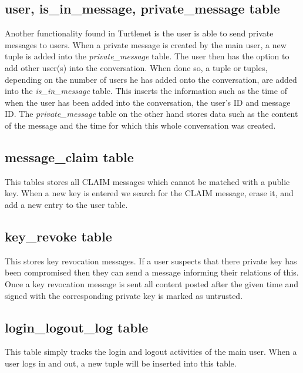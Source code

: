 \subsection{user, is\_in\_message, private\_message table}
Another functionality found in Turtlenet is the user is able to send private 
messages to users. When a private message is created by the main user, a new 
tuple is added into the {\it private\_message} table. The user then has the 
option to add other user(s) into the conversation. When done so, a tuple or 
tuples, depending on the number of users he has added onto the conversation, are 
added into the {\it is\_in\_message} table. This inserts the information such as 
the time of when the user has been added into the conversation, the user's ID 
and message ID. The {\it private\_message} table on the other hand stores data 
such as the content of the message and the time for which this whole conversation 
was created. 

\subsection{message\_claim table}
This tables stores all CLAIM messages which cannot be matched with a public key.
When a new key is entered we search for the CLAIM message, erase it, and add a
new entry to the user table.

\subsection{key\_revoke table}
This stores key revocation messages. If a user suspects that there private key
has been compromised then they can send a message informing their relations of
this. Once a key revocation message is sent all content posted after the given
time and signed with the corresponding private key is marked as untrusted.

\subsection{login\_logout\_log table}
This table simply tracks the login and logout activities of the main user. When a 
user logs in and out, a new tuple will be inserted into this table.

\clearpage

